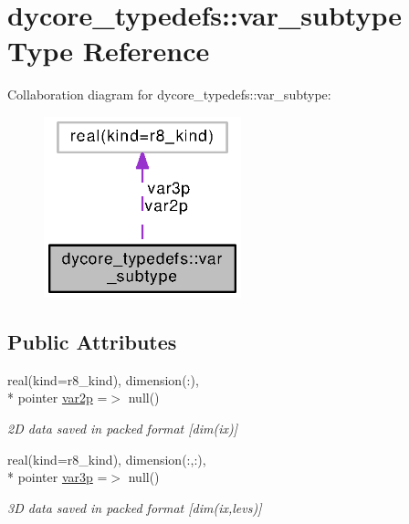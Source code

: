 \section{dycore\-\_\-typedefs\-:\-:var\-\_\-subtype Type Reference}
\label{structdycore__typedefs_1_1var__subtype}


Collaboration diagram for dycore\-\_\-typedefs\-:\-:var\-\_\-subtype\-:
\nopagebreak
\begin{figure}[H]
\begin{center}
\leavevmode
\includegraphics[width=162pt]{structdycore__typedefs_1_1var__subtype__coll__graph}
\end{center}
\end{figure}
\subsection*{Public Attributes}
\begin{DoxyCompactItemize}
\item 
real(kind=r8\-\_\-kind), dimension(\-:), \\*
pointer \hyperlink{structdycore__typedefs_1_1var__subtype_ae7f1321cbe3f9c0f1cf24af0e39bb2c6}{var2p} =$>$ null()
\begin{DoxyCompactList}\small\item\em 2\-D data saved in packed format \mbox{[}dim(ix)\mbox{]} \end{DoxyCompactList}\item 
real(kind=r8\-\_\-kind), dimension(\-:,\-:), \\*
pointer \hyperlink{structdycore__typedefs_1_1var__subtype_af3e57f945956db4f682481b4aeb5d11f}{var3p} =$>$ null()
\begin{DoxyCompactList}\small\item\em 3\-D data saved in packed format \mbox{[}dim(ix,levs)\mbox{]} \end{DoxyCompactList}\end{DoxyCompactItemize}


